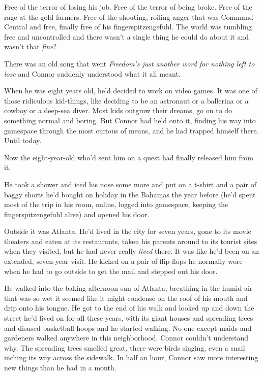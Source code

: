 Free of the terror of losing his job. Free of the terror of being
broke. Free of the rage at the gold-farmers. Free of the shouting,
roiling anger that was Command Central and free, finally free of
his fingerspitzengefuhl. The world was tumbling free and
uncontrolled and there wasn't a single thing he could do about it
and wasn't that \emph{fine}?

There was an old song that went
\emph{Freedom's just another word for nothing left to lose} and
Connor suddenly understood what it all meant.

When he was eight years old, he'd decided to work on video games.
It was one of those ridiculous kid-things, like deciding to be an
astronaut or a ballerina or a cowboy or a deep-sea diver. Most kids
outgrow their dreams, go on to do something normal and boring. But
Connor had held onto it, finding his way into gamespace through the
most curious of means, and he had trapped himself there. Until
today.

Now the eight-year-old who'd sent him on a quest had finally
released him from it.

He took a shower and iced his nose some more and put on a t-shirt
and a pair of baggy shorts he'd bought on holiday in the Bahamas
the year before (he'd spent most of the trip in his room, online,
logged into gamespace, keeping the fingerspitzengefuhl alive) and
opened his door.

Outside it was Atlanta. He'd lived in the city for seven years,
gone to its movie theaters and eaten at its restaurants, taken his
parents around to its tourist sites when they visited, but he had
never really \emph{lived} there. It was like he'd been on an
extended, seven-year visit. He kicked on a pair of flip-flops he
normally wore when he had to go outside to get the mail and stepped
out his door.

He walked into the baking afternoon sun of Atlanta, breathing in
the humid air that was so wet it seemed like it might condense on
the roof of his mouth and drip onto his tongue. He got to the end
of his walk and looked up and down the street he'd lived on for all
these years, with its giant houses and spreading trees and disused
basketball hoops and he started walking. No one except maids and
gardeners walked anywhere in this neighborhood. Connor couldn't
understand why. The spreading trees smelled great, there were birds
singing, even a snail inching its way across the sidewalk. In half
an hour, Connor saw more interesting new things than he had in a
month.

